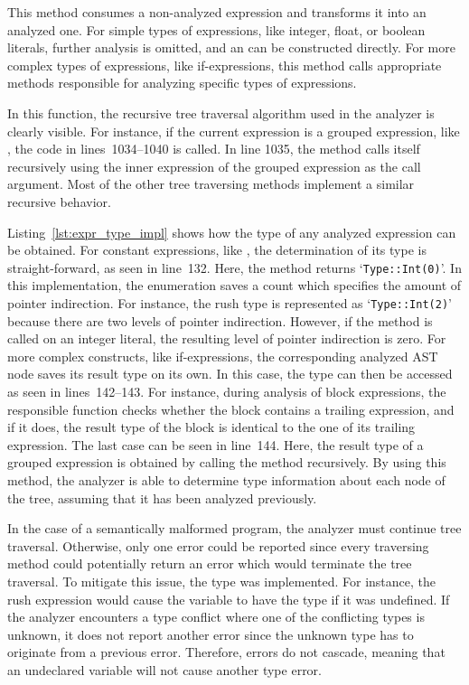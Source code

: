 This method consumes a non-analyzed expression and transforms it into an analyzed one.
For simple types of expressions, like integer, float, or boolean literals, further analysis is omitted, and an  can be constructed directly.
For more complex types of expressions, like if-expressions, this method calls appropriate methods responsible for analyzing specific types of expressions.

In this function, the recursive tree traversal algorithm used in the analyzer is clearly visible.
For instance, if the current expression is a grouped expression, like , the code in lines~1034--1040 is called.
In line 1035, the  method calls itself recursively using the inner expression of the grouped expression as the call argument.
Most of the other tree traversing methods implement a similar recursive behavior.


Listing~\ref{lst:expr_type_impl} shows how the type of any analyzed expression can be obtained.
For constant expressions, like , the determination of its type is straight-forward, as seen in line~132.
Here, the  method returns `\verb|Type::Int(0)|'.
In this implementation, the  enumeration saves a count which specifies the amount of pointer indirection.
For instance, the rush type  is represented as `\verb|Type::Int(2)|' because there are two levels of pointer indirection.
However, if the method is called on an integer literal, the resulting level of pointer indirection is zero.
For more complex constructs, like if-expressions, the corresponding analyzed AST node saves its result type on its own.
In this case, the type can then be accessed as seen in lines~142--143.
For instance, during analysis of block expressions, the responsible function checks whether the block contains a trailing expression, and if it does, the result type of the block is identical to the one of its trailing expression.
The last case can be seen in line~144.
Here, the result type of a grouped expression is obtained by calling the  method recursively.
By using this method, the analyzer is able to determine type information about each node of the tree, assuming that it has been analyzed previously.

In the case of a semantically malformed program, the analyzer must continue tree traversal.
Otherwise, only one error could be reported since every traversing method could potentially return an error which would terminate the tree traversal.
To mitigate this issue, the  type was implemented.
For instance, the rush expression  would cause the  variable to have the  type if it was undefined.
If the analyzer encounters a type conflict where one of the conflicting types is unknown,
it does not report another error since the unknown type has to originate from a previous error.
Therefore, errors do not cascade, meaning that an undeclared variable will not cause another type error.

